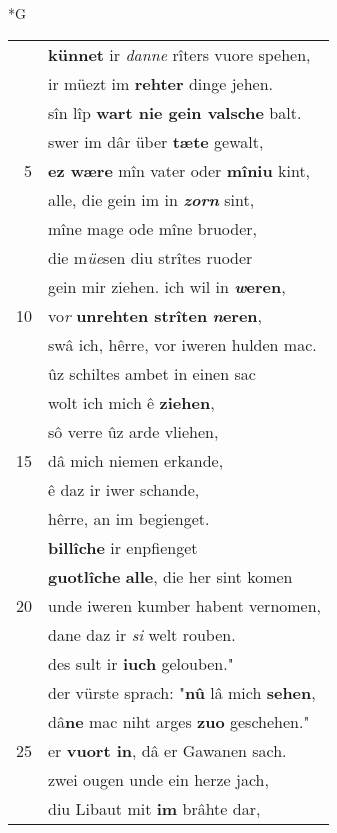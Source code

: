 \documentclass[8pt,a4paper,notitlepage]{article}
\begin{document}
\newpage
\begin{table}[ht]
\begin{minipage}[t]{0.5\linewidth}
\small
\begin{center}*G
\end{center}
\begin{tabular}{rl}
 & \textbf{künnet} ir \textit{danne} rîters vuore spehen,\\ 
 & ir müezt im \textbf{rehter} dinge jehen.\\ 
 & sîn lîp \textbf{wart nie gein valsche} balt.\\ 
 & swer im dâr über \textbf{tæte} gewalt,\\ 
5 & \textbf{ez wære} mîn vater oder \textbf{mîniu} kint,\\ 
 & alle, die gein im in \textit{\textbf{zorn}} sint,\\ 
 & mîne mage ode mîne bruoder,\\ 
 & die m\textit{üe}sen diu strîtes ruoder\\ 
 & gein mir ziehen. ich wil in \textbf{\textit{w}eren},\\ 
10 & vo\textit{r} \textbf{unrehten strîten} \textbf{\textit{n}eren},\\ 
 & swâ ich, hêrre, vor iweren hulden mac.\\ 
 & ûz schiltes ambet in einen sac\\ 
 & wolt ich mich ê \textbf{ziehen},\\ 
 & sô verre ûz arde vliehen,\\ 
15 & dâ mich niemen erkande,\\ 
 & ê daz ir iwer schande,\\ 
 & hêrre, an im begienget.\\ 
 & \textbf{billîche} ir enpfienget\\ 
 & \textbf{guotlîche} \textbf{alle}, die her sint komen\\ 
20 & unde iweren kumber habent vernomen,\\ 
 & dane daz ir \textit{si} welt rouben.\\ 
 & des sult ir \textbf{iuch} gelouben."\\ 
 & der vürste sprach: "\textbf{nû} lâ mich \textbf{sehen},\\ 
 & dâ\textbf{ne} mac niht arges \textbf{zuo} geschehen."\\ 
25 & er \textbf{vuort in}, dâ er Gawanen sach.\\ 
 & zwei ougen unde ein herze jach,\\ 
 & diu Libaut mit \textbf{im} brâhte dar,\\ 

\end{tabular}
\end{minipage}
\end{table}
\end{document}
